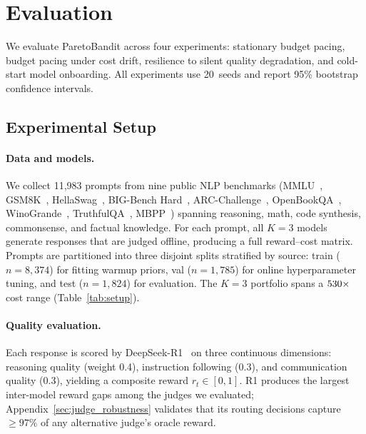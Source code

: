 \section{Evaluation}
\label{sec:evaluation}

We evaluate ParetoBandit across four experiments: stationary budget pacing, budget pacing under cost drift, resilience to silent quality degradation, and cold-start model onboarding. All experiments use 20~seeds and report 95\% bootstrap confidence intervals.

\subsection{Experimental Setup}
\label{sec:eval_setup}

\paragraph{Data and models.}
We collect 11,983 prompts from nine public NLP benchmarks (MMLU~\cite{hendrycks2021measuring}, GSM8K~\cite{cobbe2021gsm8k}, HellaSwag~\cite{zellers2019hellaswag}, BIG-Bench Hard~\cite{suzgun2022challenging}, ARC-Challenge~\cite{clark2018arc}, OpenBookQA~\cite{mihaylov2018suit}, WinoGrande~\cite{sakaguchi2020winogrande}, TruthfulQA~\cite{lin2022truthfulqa}, MBPP~\cite{austin2021program}) spanning reasoning, math, code synthesis, commonsense, and factual knowledge. For each prompt, all $K{=}3$ models generate responses that are judged offline, producing a full reward--cost matrix. Prompts are partitioned into three disjoint splits stratified by source: train ($n{=}8{,}374$) for fitting warmup priors, val ($n{=}1{,}785$) for online hyperparameter tuning, and test ($n{=}1{,}824$) for evaluation. The $K{=}3$ portfolio spans a $530{\times}$ cost range (Table~\ref{tab:setup}).

\paragraph{Quality evaluation.}
Each response is scored by DeepSeek-R1~\cite{deepseekai2025deepseekr1} on three continuous dimensions: reasoning quality (weight 0.4), instruction following (0.3), and communication quality (0.3), yielding a composite reward $r_t \in [0, 1]$. R1 produces the largest inter-model reward gaps among the judges we evaluated; Appendix~\ref{sec:judge_robustness} validates that its routing decisions capture ${\geq}97\%$ of any alternative judge's oracle reward.

